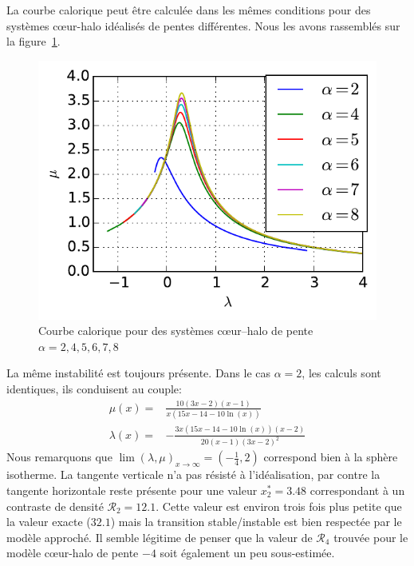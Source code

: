 	La courbe calorique peut être calculée dans les mêmes conditions pour des systèmes cœur-halo idéalisés de pentes différentes. Nous les avons
	rassemblés sur la figure~\ref{ToyModel::AllAlpha}.
	\begin{figure}
			\centering \includegraphics{theorie/graphe/alpha_all.pdf}
			\caption{Courbe calorique pour des systèmes cœur--halo de pente $\alpha=2, 4, 5, 6, 7, 8$\label{ToyModel::AllAlpha}}
	\end{figure}
	La même instabilité est toujours présente. Dans le cas $\alpha=2$, les calculs sont identiques, ils conduisent au couple:
	\begin{eqnarray}
		\mu(x) =& \frac{10 (3x-2) (x-1)}{x(15x-14-10\ln(x))} \\
		\lambda(x) =& -\frac{3x(15x-14-10\ln(x))(x-2)}{20(x-1)(3x-2)^2}
	\end{eqnarray}
	Nous remarquons que $\lim(\lambda,\mu)_{x\to\infty}=(-\frac{1}{4},2)$ correspond bien à la sphère isotherme. La tangente verticale n'a pas
	résisté à l'idéalisation, par contre la tangente horizontale reste présente pour une valeur $x^*_2=3.48$ correspondant à un contraste de
	densité $\mathcal{R}_2= 12.1$. Cette valeur est environ trois fois plus petite que la valeur exacte ($32.1$) mais la transition stable/instable
	est bien respectée par le modèle approché. Il semble légitime de penser que la valeur de $\mathcal{R}_4$ trouvée pour le modèle cœur-halo de
	pente $-4$ soit également un peu sous-estimée.
